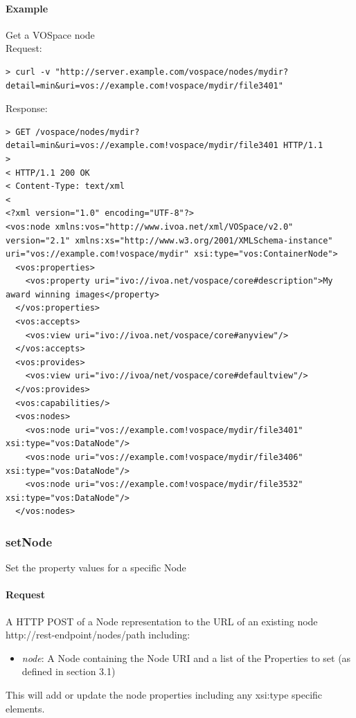 \documentclass[11pt,a4paper]{ivoa}
\begin{document}
\paragraph{Example}
Get a VOSpace node
\\[5px]
\noindent
Request:
\begin{lstlisting}
> curl -v "http://server.example.com/vospace/nodes/mydir?detail=min&uri=vos://example.com!vospace/mydir/file3401"
\end{lstlisting}
Response:
\begin{lstlisting}
> GET /vospace/nodes/mydir?detail=min&uri=vos://example.com!vospace/mydir/file3401 HTTP/1.1
>
< HTTP/1.1 200 OK
< Content-Type: text/xml
<
<?xml version="1.0" encoding="UTF-8"?>
<vos:node xmlns:vos="http://www.ivoa.net/xml/VOSpace/v2.0" version="2.1" xmlns:xs="http://www.w3.org/2001/XMLSchema-instance" uri="vos://example.com!vospace/mydir" xsi:type="vos:ContainerNode">
  <vos:properties>
    <vos:property uri="ivo://ivoa.net/vospace/core#description">My award winning images</property>
  </vos:properties>
  <vos:accepts>
    <vos:view uri="ivo://ivoa.net/vospace/core#anyview"/>
  </vos:accepts>
  <vos:provides>
    <vos:view uri="ivo://ivoa/net/vospace/core#defaultview"/>
  </vos:provides>
  <vos:capabilities/>
  <vos:nodes>
    <vos:node uri="vos://example.com!vospace/mydir/file3401" xsi:type="vos:DataNode"/>
    <vos:node uri="vos://example.com!vospace/mydir/file3406" xsi:type="vos:DataNode"/>
    <vos:node uri="vos://example.com!vospace/mydir/file3532" xsi:type="vos:DataNode"/>
  </vos:nodes>
\end{lstlisting}

\subsubsection{setNode}
\label{subsubsec:setnode}
Set the property values for a specific Node

\paragraph{Request}
A HTTP POST of a Node representation to the URL of an existing node http://rest-endpoint/nodes/path including:
\begin{itemize}
    \item \emph{node}: A Node containing the Node URI and a list of the Properties to set (as defined in section 3.1)
\end{itemize}
This will add or update the node properties including any xsi:type specific elements.
\end{document}
